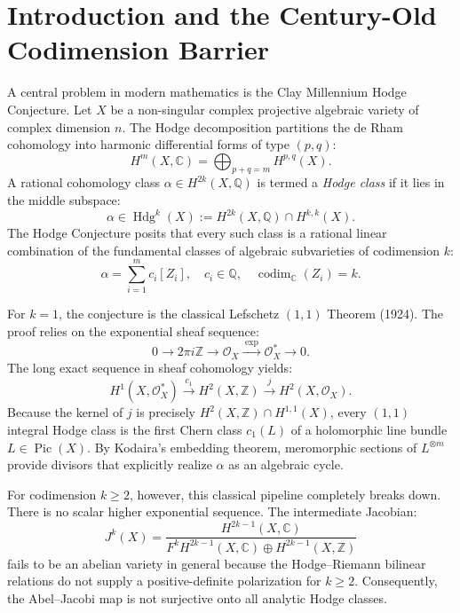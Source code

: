 \documentclass[11pt,a4paper]{article}
\theoremstyle{definition}
\begin{document}
\section{Introduction and the Century-Old Codimension Barrier}

A central problem in modern mathematics is the Clay Millennium Hodge Conjecture. Let $X$ be a non-singular complex projective algebraic variety of complex dimension $n$. The Hodge decomposition partitions the de Rham cohomology into harmonic differential forms of type $(p,q)$:
\begin{equation}
H^m(X, \mathbb{C}) = \bigoplus_{p+q=m} H^{p,q}(X).
\end{equation}
A rational cohomology class $\alpha \in H^{2k}(X, \mathbb{Q})$ is termed a \emph{Hodge class} if it lies in the middle subspace:
\begin{equation}
\alpha \in \operatorname{Hdg}^k(X) := H^{2k}(X, \mathbb{Q}) \cap H^{k,k}(X).
\end{equation}
The Hodge Conjecture posits that every such class is a rational linear combination of the fundamental classes of algebraic subvarieties of codimension $k$:
\begin{equation}
\alpha = \sum_{i=1}^m c_i [Z_i], \quad c_i \in \mathbb{Q}, \quad \operatorname{codim}_{\mathbb{C}}(Z_i) = k.
\end{equation}

For $k=1$, the conjecture is the classical Lefschetz $(1,1)$ Theorem (1924). The proof relies on the exponential sheaf sequence:
\begin{equation}
0 \longrightarrow 2\pi i \mathbb{Z} \longrightarrow \mathcal{O}_X \xrightarrow{\;\exp\;} \mathcal{O}_X^* \longrightarrow 0.
\end{equation}
The long exact sequence in sheaf cohomology yields:
\begin{equation}
H^1(X, \mathcal{O}_X^*) \xrightarrow{\;c_1\;} H^2(X, \mathbb{Z}) \xrightarrow{\;j\;} H^2(X, \mathcal{O}_X).
\end{equation}
Because the kernel of $j$ is precisely $H^2(X, \mathbb{Z}) \cap H^{1,1}(X)$, every $(1,1)$ integral Hodge class is the first Chern class $c_1(L)$ of a holomorphic line bundle $L \in \operatorname{Pic}(X)$. By Kodaira's embedding theorem, meromorphic sections of $L^{\otimes m}$ provide divisors that explicitly realize $\alpha$ as an algebraic cycle.

For codimension $k \ge 2$, however, this classical pipeline completely breaks down. There is no scalar higher exponential sequence. The intermediate Jacobian:
\begin{equation}
J^k(X) = \frac{H^{2k-1}(X, \mathbb{C})}{F^k H^{2k-1}(X, \mathbb{C}) \oplus H^{2k-1}(X, \mathbb{Z})}
\end{equation}
fails to be an abelian variety in general because the Hodge--Riemann bilinear relations do not supply a positive-definite polarization for $k \ge 2$. Consequently, the Abel--Jacobi map is not surjective onto all analytic Hodge classes.
\end{document}

